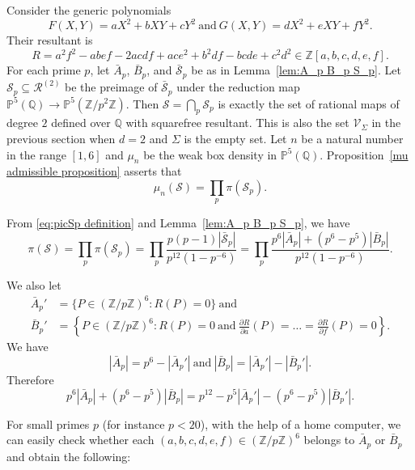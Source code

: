 \documentclass[12pt]{amsart}
\newcommand{\Z}{\mathbb{Z}}
\newcommand{\Q}{\mathbb{Q}}
\newcommand{\cR}{\mathcal{R}}
\newcommand{\cS}{\mathcal{S}}
\newcommand{\V}{\mathcal{V}}
\numberwithin{equation}{section}
\begin{document}
Consider the generic polynomials
$$F(X,Y)=aX^2+bXY+cY^2\ \text{and}\ G(X,Y)=dX^2+eXY+fY^2.$$
Their resultant is
$$R=a^2f^2-abef-2acdf+ace^2+b^2df-bcde+c^2d^2\in\Z[a,b,c,d,e,f].$$
For each prime $p$, let $\bar{A}_p$, $\bar{B}_p$, and $\bar{\mathcal{S}}_p$ be as in Lemma~\ref{lem:A_p B_p S_p}. Let $\mathcal{S}_p\subseteq \cR^{(2)}$ be the preimage of 
$\bar{\mathcal{S}}_p$ under the reduction map
$\mathbb{P}^5(\Q)\rightarrow\mathbb{P}^5(\Z/p^2\Z)$. Then $\mathcal{S}=\bigcap_p \mathcal{S}_p$
is exactly the set of rational maps of degree $2$ defined over $\Q$ with squarefree resultant. This is also the set $\V_{\Sigma}$ in the previous section when $d=2$ and $\Sigma$ is the empty set.
Let $n$ be a natural number in the range $[1,6]$ and $\mu_n$ be the weak box density in $\mathbb{P}^5(\Q)$. Proposition~\ref{mu admissible proposition} asserts that  
\begin{equation}\label{mu_n(cS_p)=prod_p pi(cS_p)}
    \mu_n(\cS)=\prod_p \pi(\cS_p).
\end{equation}


From \eqref{eq:picSp definition} and Lemma~\ref{lem:A_p B_p S_p}, we have
\begin{equation}\label{eq:S and the A_p B_p}
 \pi(\mathcal{S})=\prod_p\pi(\mathcal{S}_p)=\prod_{p}\frac{p(p-1)|\bar{\mathcal{S}}_p|}{p^{12}(1-p^{-6})}=\prod_p\frac{p^6|\bar{A}_p|+(p^6-p^5)|\bar{B}_p|}{p^{12}(1-p^{-6})}.   
\end{equation}


We also let
\begin{align*}
    \bar{A}_p'&=\{P\in(\Z/p\Z)^6: R(P)=0\}\ \text{and}\\
    \bar{B}_p'&=\left\{P\in(\Z/p\Z)^6: R(P)=0\ \text{and}\ \frac{\partial R}{\partial a}(P)=\ldots=\frac{\partial R}{\partial f}(P)=0\right\}.
\end{align*}
We have
\begin{equation}\label{eq:relation among A_p, A_p',...}
    |\bar{A}_p|=p^{6}-|\bar{A}_p'|\ \text{and}\ |\bar{B}_p|=|\bar{A}_p'|-|\bar{B}_p'|.
\end{equation}
Therefore
\begin{equation}\label{eq:in terms of A' and B'}
    p^6|\bar{A}_p|+(p^6-p^5)|\bar{B}_p|=p^{12}-p^5|\bar{A}_p'|-(p^6-p^5)|\bar{B}_p'|.
\end{equation}

For small primes $p$ (for instance $p<20$), with the help of a home computer, we can easily check whether each $(a,b,c,d,e,f)\in (\Z/p\Z)^6$ belongs to $\bar{A}_p$ or $\bar{B}_p$ and obtain the following:
\end{document}
